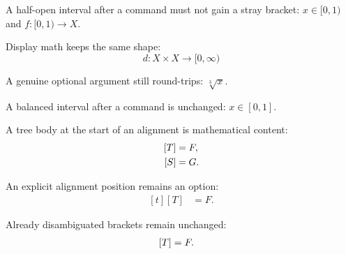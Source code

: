 A half-open interval after a command must not gain a stray bracket:
\(x\in[0,1)\) and \(f\colon[0,1)\to X\).

Display math keeps the same shape: \[d:X\times X\to[0,\infty)\]

A genuine optional argument still round-trips: \(\sqrt[3]{x}\).

A balanced interval after a command is unchanged: \(x\in[0,1]\).

A tree body at the start of an alignment is mathematical content:
\[\begin{aligned}\relax
[T]&=F,\\
[S]&=G.
\end{aligned}\]

An explicit alignment position remains an option: \[\begin{aligned}[t]
[T]&=F.
\end{aligned}\]

Already disambiguated brackets remain unchanged:
\[\begin{aligned}\relax[T]&=F.\end{aligned}\]

